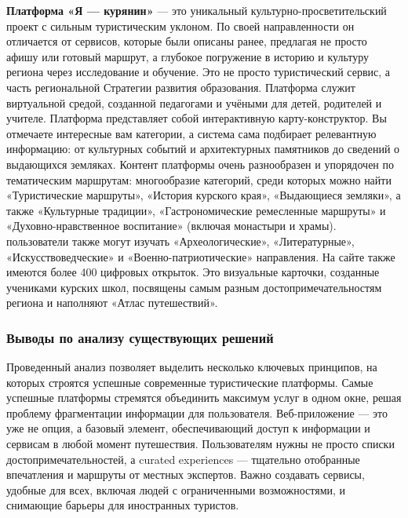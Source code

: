 \textbf{Платформа «Я — курянин»} --- это уникальный культурно-просветительский проект с сильным туристическим уклоном. По своей направленности он отличается от сервисов, которые были описаны ранее, предлагая не просто афишу или готовый маршрут, а глубокое погружение в историю и культуру региона через исследование и обучение. Это не просто туристический сервис, а часть региональной Стратегии развития образования. Платформа служит виртуальной средой, созданной педагогами и учёными для детей, родителей и учителе. Платформа представляет собой интерактивную карту-конструктор. Вы отмечаете интересные вам категории, а система сама подбирает релевантную информацию: от культурных событий и архитектурных памятников до сведений о выдающихся земляках. Контент платформы очень разнообразен и упорядочен по тематическим маршрутам: многообразие категорий, среди которых можно найти «Туристические маршруты», «История курского края», «Выдающиеся земляки», а также «Культурные традиции», «Гастрономические ремесленные маршруты» и «Духовно-нравственное воспитание» (включая монастыри и храмы). пользователи также могут изучать «Археологические», «Литературные», «Искусствоведческие» и «Военно-патриотические» направления. На сайте также имеются более 400 цифровых открыток. Это визуальные карточки, созданные учениками курских школ, посвящены самым разным достопримечательностям региона и наполняют «Атлас путешествий».
\subsubsection{Выводы по анализу существующих решений}

Проведенный анализ позволяет выделить несколько ключевых принципов, на которых строятся успешные современные туристические платформы. Самые успешные платформы стремятся объединить максимум услуг в одном окне, решая проблему фрагментации информации для пользователя. Веб-приложение — это уже не опция, а базовый элемент, обеспечивающий доступ к информации и сервисам в любой момент путешествия. Пользователям нужны не просто списки достопримечательностей, а curated experiences — тщательно отобранные впечатления и маршруты от местных экспертов. Важно создавать сервисы, удобные для всех, включая людей с ограниченными возможностями, и снимающие барьеры для иностранных туристов.



